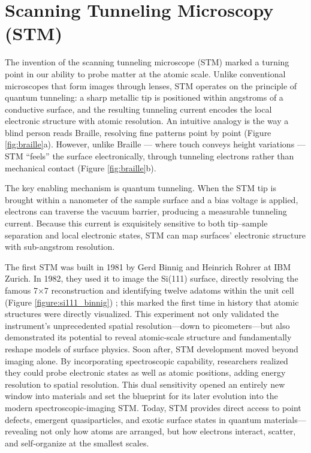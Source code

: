 \chapter{Scanning Tunneling Microscopy (STM)}
The invention of the scanning tunneling microscope (STM) marked a turning point in our ability to probe matter at the atomic scale. Unlike conventional microscopes that form images through lenses, STM operates on the principle of quantum tunneling: a sharp metallic tip is positioned within angstroms of a conductive surface, and the resulting tunneling current encodes the local electronic structure with atomic resolution. An intuitive analogy is the way a blind person reads Braille, resolving fine patterns point by point (Figure \ref{fig:braille}a). However, unlike Braille — where touch conveys height variations — STM “feels” the surface electronically, through tunneling electrons rather than mechanical contact (Figure \ref{fig:braille}b).

The key enabling mechanism is quantum tunneling. When the STM tip is brought within a nanometer of the sample surface and a bias voltage is applied, electrons can traverse the vacuum barrier, producing a measurable tunneling current. Because this current is exquisitely sensitive to both tip–sample separation and local electronic states, STM can map surfaces' electronic structure with sub-angstrom resolution.

The first STM was built in 1981 by Gerd Binnig and Heinrich Rohrer at IBM Zurich. In 1982, they used it to image the Si(111) surface, directly resolving the famous 7×7 reconstruction and identifying twelve adatoms within the unit cell (Figure \ref{figure:si111_binnig}) \cite{binnig77Reconstruction1983}; this marked the first time in history that atomic structures were directly visualized. This experiment not only validated the instrument’s unprecedented spatial resolution—down to picometers—but also demonstrated its potential to reveal atomic-scale structure and fundamentally reshape models of surface physics. Soon after, STM development moved beyond imaging alone. By incorporating spectroscopic capability, researchers realized they could probe electronic states as well as atomic positions, adding energy resolution to spatial resolution. This dual sensitivity opened an entirely new window into materials and set the blueprint for its later evolution into the modern spectroscopic-imaging STM. Today, STM provides direct access to point defects, emergent quasiparticles, and exotic surface states in quantum materials—revealing not only how atoms are arranged, but how electrons interact, scatter, and self-organize at the smallest scales.

